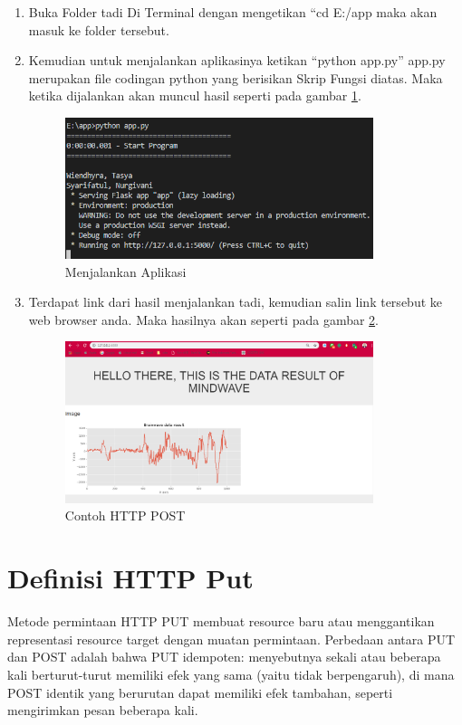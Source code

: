 \begin{enumerate}
\item Buka Folder tadi Di Terminal dengan mengetikan “cd E:/app maka akan masuk ke folder tersebut.
\item Kemudian untuk menjalankan aplikasinya ketikan “python app.py” app.py merupakan file codingan python yang berisikan Skrip Fungsi diatas. Maka ketika dijalankan akan muncul hasil seperti pada gambar \ref{fig:ja}.
\begin{figure}[!htbp]
	\centerline{\includegraphics[width=0.85\textwidth]{figures/11/ja.PNG}}
	\caption{Menjalankan Aplikasi}
	\label{fig:ja}
\end{figure}

\item Terdapat link dari hasil menjalankan tadi, kemudian salin link tersebut ke web browser anda. Maka hasilnya akan seperti pada gambar \ref{fig:chp}.
\begin{figure}[!htbp]
	\centerline{\includegraphics[width=0.85\textwidth]{figures/11/chp.PNG}}
	\caption{Contoh HTTP POST}
	\label{fig:chp}
\end{figure}
\end{enumerate}

\section{Definisi HTTP Put}
Metode permintaan HTTP PUT membuat resource baru atau menggantikan representasi resource target dengan muatan permintaan. Perbedaan antara PUT dan POST adalah bahwa PUT idempoten: menyebutnya sekali atau beberapa kali berturut-turut memiliki efek yang sama (yaitu tidak berpengaruh), di mana POST identik yang berurutan dapat memiliki efek tambahan, seperti mengirimkan pesan beberapa kali.

